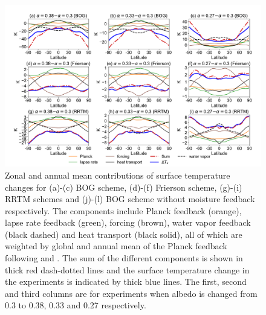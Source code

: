 

\begin{figure}[ht]
	\centering
	\includegraphics[width=1.0\linewidth]{figs/polar_amp/delta_ts_decomp}
	\caption[Zonal and annual mean contributions of surface temperature changes from forcing, heat transport and climate feedbacks]{Zonal and annual mean contributions of surface temperature changes for (a)-(c) BOG scheme, (d)-(f) Frierson scheme, (g)-(i) RRTM schemes and (j)-(l) BOG scheme without moisture feedback respectively. The components include Planck feedback (orange), lapse rate feedback (green), forcing (brown), water vapor feedback (black dashed) and heat transport (black solid), all of which are weighted by global and annual mean of the Planck feedback following \cite{Feldl2013a} and \cite{Kim2018}. The sum of the different components is shown in thick red dash-dotted lines and the surface temperature change in the experiments is indicated by thick blue lines. The first, second and third columns are for experiments when albedo is changed from 0.3 to 0.38, 0.33 and 0.27 respectively.}
	\label{fig:delta_ts_decomp} 
\end{figure}


